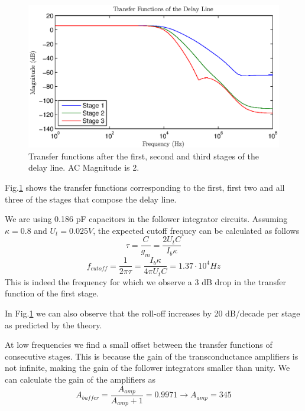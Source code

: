 \begin{figure}[!h]
	\center
	\includegraphics{exp2.eps}
	\caption{Transfer functions after the first, second and third stages of the delay line. AC Magnitude is 2.}
	\label{fig:3}
\end{figure}
Fig.\ref{fig:3} shows the transfer functions corresponding to the first, first two and all three of the stages that compose the delay line. 

We are using 0.186 pF capacitors in the follower integrator circuits. Assuming \(\kappa=0.8\) and \(U_t=0.025V\), the expected cutoff frequcy can be calculated as follows
\begin{equation*}
	\tau = \frac{C}{g_m} = \frac{2U_tC}{I_b\kappa} 
\end{equation*}
\begin{equation*}
	f_{cutoff} = \frac{1}{2\pi\tau} = \frac{I_b\kappa}{4\pi U_tC} = 1.37\cdot10^{4} Hz
\end{equation*}
This is indeed the frequency for which we observe a 3 dB drop in the transfer function of the first stage. 

In Fig.\ref{fig:3} we can also observe that the roll-off increases by 20 dB/decade per stage as predicted by the theory.

At low frequencies we find a small offset between the transfer functions of consecutive stages. This is because the gain of the transconductance amplifiers is not infinite, making the gain of the follower integrators smaller than unity. We can calculate the gain of the amplifiers as
\begin{equation*}
	A_{buffer}=\frac{A_{amp}}{A_{amp}+1} = 0.9971 \rightarrow A_{amp} = 345 
\end{equation*}



